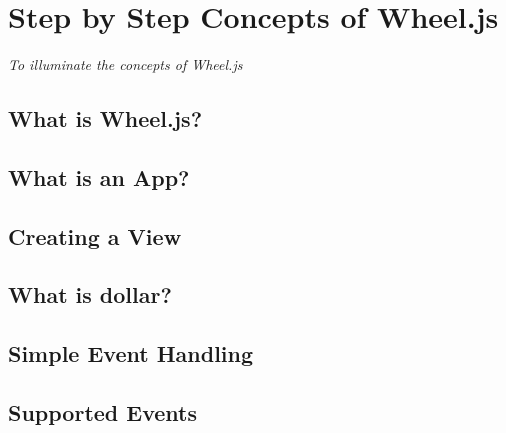 \chapter{Step by Step Concepts of Wheel.js}
\begin{center}
{\small\em To illuminate the concepts of Wheel.js}
\end{center}


\section{What is Wheel.js?} %
\label{sec:What is Wheel.js?}


\section{What is an App?} %
\label{sec:What is an App?}


\section{Creating a View} %
\label{sec:Creating a View}


\section{What is dollar?} %
\label{sec:What is dollar?}


\section{Simple Event Handling} %
\label{sec:Simple Event Handling}


\section{Supported Events} %
\label{sec:Supported Events}

